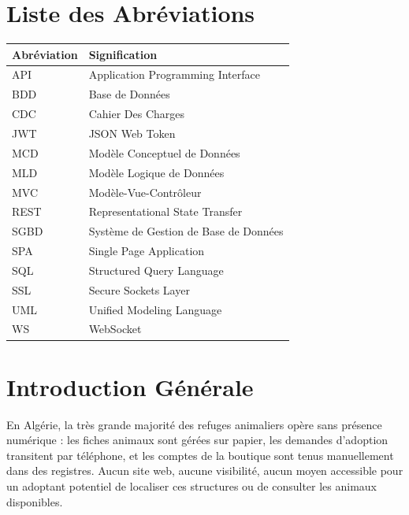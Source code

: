 \documentclass[12pt,a4paper]{report}
\begin{document}
\chapter*{Liste des Abréviations}
\thispagestyle{plain}

\begin{tabular}{@{}ll@{}}
\toprule
\textbf{Abréviation} & \textbf{Signification} \\
\midrule
API     & Application Programming Interface \\
BDD     & Base de Données \\
CDC     & Cahier Des Charges \\
JWT     & JSON Web Token \\
MCD     & Modèle Conceptuel de Données \\
MLD     & Modèle Logique de Données \\
MVC     & Modèle-Vue-Contrôleur \\
REST    & Representational State Transfer \\
SGBD    & Système de Gestion de Base de Données \\
SPA     & Single Page Application \\
SQL     & Structured Query Language \\
SSL     & Secure Sockets Layer \\
UML     & Unified Modeling Language \\
WS      & WebSocket \\
\bottomrule
\end{tabular}

\cleardoublepage
{}
\setcounter{page}{1}

\chapter*{Introduction Générale}
\thispagestyle{plain}

En Algérie, la très grande majorité des refuges animaliers opère sans présence numérique : les fiches animaux sont gérées sur papier, les demandes d'adoption transitent par téléphone, et les comptes de la boutique sont tenus manuellement dans des registres. Aucun site web, aucune visibilité, aucun moyen accessible pour un adoptant potentiel de localiser ces structures ou de consulter les animaux disponibles.
\end{document}
